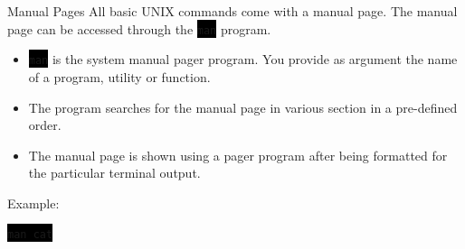 \documentclass[unknownkeysallowed, 10pt, a4 paper, handout]{beamer}
\newcommand{\code}[1]{\colorbox{black}{\color{green}\texttt{#1}}}
\begin{document}
\begin{frame}[label=manual]{Manual Pages}
  All basic UNIX commands come with a manual page. The manual page can
  be accessed through the \code{man} program.
  \begin{itemize}
     \item \code{man} is the system manual pager program. You provide
       as argument the name of a program, utility or function.
     \item The program searches for the manual page in various section in
       a pre-defined order.
     \item The manual page is shown using a pager program after being
       formatted for the particular terminal output.
  \end{itemize}
  Example:
  \begin{center}
    \code{man cat}
  \end{center}
\end{frame}
\end{document}
